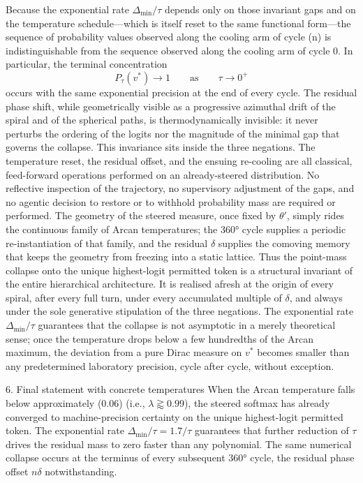 Because the exponential rate \(\Delta_{\min}/\tau\) depends only on those invariant gaps and on the temperature schedule—which is itself reset to the same functional form—the sequence of probability values observed along the cooling arm of cycle (n) is indistinguishable from the sequence observed along the cooling arm of cycle 0. In particular, the terminal concentration
\[
P_{\tau}(v^*)\to1\qquad\text{as}\qquad\tau\to0^+
\]
occurs with the same exponential precision at the end of every cycle. The residual phase shift, while geometrically visible as a progressive azimuthal drift of the spiral and of the spherical paths, is thermodynamically invisible: it never perturbs the ordering of the logits nor the magnitude of the minimal gap that governs the collapse.
This invariance sits inside the three negations. The temperature reset, the residual offset, and the ensuing re-cooling are all classical, feed-forward operations performed on an already-steered distribution. No reflective inspection of the trajectory, no supervisory adjustment of the gaps, and no agentic decision to restore or to withhold probability mass are required or performed. The geometry of the steered measure, once fixed by \(\theta'\), simply rides the continuous family of Arcan temperatures; the 360° cycle supplies a periodic re-instantiation of that family, and the residual \(\delta\) supplies the comoving memory that keeps the geometry from freezing into a static lattice.
Thus the point-mass collapse onto the unique highest-logit permitted token is a structural invariant of the entire hierarchical architecture. It is realised afresh at the origin of every spiral, after every full turn, under every accumulated multiple of \(\delta\), and always under the sole generative stipulation of the three negations. The exponential rate \(\Delta_{\min}/\tau\) guarantees that the collapse is not asymptotic in a merely theoretical sense; once the temperature drops below a few hundredths of the Arcan maximum, the deviation from a pure Dirac measure on \(v^*\) becomes smaller than any predetermined laboratory precision, cycle after cycle, without exception.

6. Final statement with concrete temperatures
When the Arcan temperature falls below approximately (0.06) (i.e., \(\lambda\gtrapprox0.99\)), the steered softmax has already converged to machine-precision certainty on the unique highest-logit permitted token. The exponential rate \(\Delta_{\min}/\tau=1.7/\tau\) guarantees that further reduction of \(\tau\) drives the residual mass to zero faster than any polynomial. The same numerical collapse occurs at the terminus of every subsequent 360° cycle, the residual phase offset \(n\delta\) notwithstanding.

